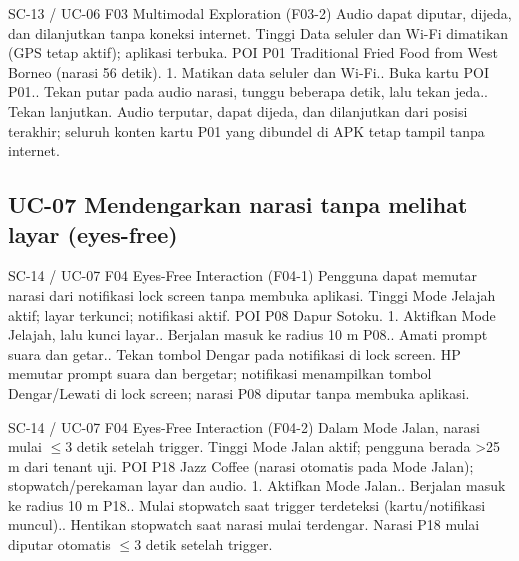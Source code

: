 \renewcommand{\tcactual}{Sesuai ekspektasi pada perangkat Android (Resolusi aset offline lolos (\texttt{03-multimodal})). Audio terputar, dapat dijeda, dan dilanjutkan dari posisi terakhir; seluruh konten kartu P01 yang dibundel di APK tetap tampil tanpa internet.}
{SC-13 / UC-06}
{F03 Multimodal Exploration}
{(F03-2) Audio dapat diputar, dijeda, dan dilanjutkan tanpa koneksi internet.}
{Tinggi}
{Data seluler dan Wi-Fi dimatikan (GPS tetap aktif); aplikasi terbuka.}
{POI P01 Traditional Fried Food from West Borneo (narasi 56 detik).}
{1. Matikan data seluler dan Wi-Fi.. Buka kartu POI P01.. Tekan putar pada audio narasi, tunggu beberapa detik, lalu tekan jeda.. Tekan lanjutkan.}
{Audio terputar, dapat dijeda, dan dilanjutkan dari posisi terakhir; seluruh konten kartu P01 yang dibundel di APK tetap tampil tanpa internet.}

\subsection*{UC-07 Mendengarkan narasi tanpa melihat layar (eyes-free)}

\renewcommand{\tcactual}{Sesuai ekspektasi pada perangkat Android (Aksi notifikasi lolos (\texttt{actions.test})). HP memutar prompt suara dan bergetar; notifikasi menampilkan tombol Dengar/Lewati di lock screen; narasi P08 diputar tanpa membuka aplikasi.}
{SC-14 / UC-07}
{F04 Eyes-Free Interaction}
{(F04-1) Pengguna dapat memutar narasi dari notifikasi lock screen tanpa membuka aplikasi.}
{Tinggi}
{Mode Jelajah aktif; layar terkunci; notifikasi aktif.}
{POI P08 Dapur Sotoku.}
{1. Aktifkan Mode Jelajah, lalu kunci layar.. Berjalan masuk ke radius 10 m P08.. Amati prompt suara dan getar.. Tekan tombol Dengar pada notifikasi di lock screen.}
{HP memutar prompt suara dan bergetar; notifikasi menampilkan tombol Dengar/Lewati di lock screen; narasi P08 diputar tanpa membuka aplikasi.}

\renewcommand{\tcactual}{Sesuai ekspektasi pada perangkat Android (Auto-play Mode Jalan lolos (\texttt{walkMode.test})). Narasi P18 mulai diputar otomatis \(\le\)3 detik setelah trigger.}
{SC-14 / UC-07}
{F04 Eyes-Free Interaction}
{(F04-2) Dalam Mode Jalan, narasi mulai \(\le\)3 detik setelah trigger.}
{Tinggi}
{Mode Jalan aktif; pengguna berada >25 m dari tenant uji.}
{POI P18 Jazz Coffee (narasi otomatis pada Mode Jalan); stopwatch/perekaman layar dan audio.}
{1. Aktifkan Mode Jalan.. Berjalan masuk ke radius 10 m P18.. Mulai stopwatch saat trigger terdeteksi (kartu/notifikasi muncul).. Hentikan stopwatch saat narasi mulai terdengar.}
{Narasi P18 mulai diputar otomatis \(\le\)3 detik setelah trigger.}

